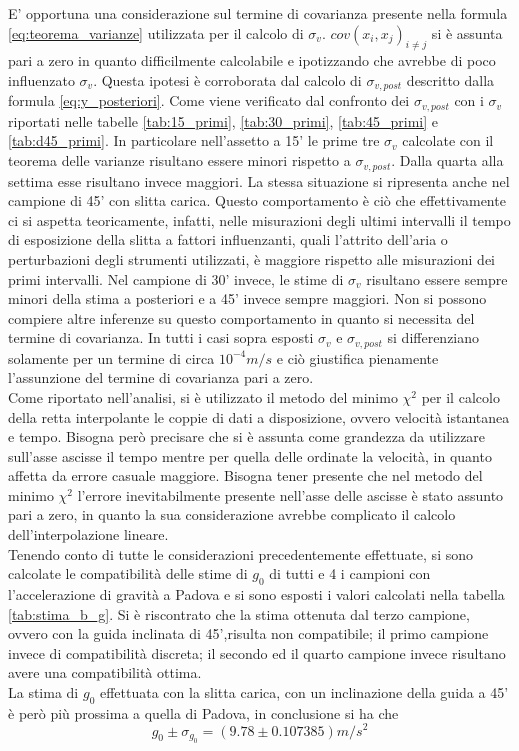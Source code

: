 \documentclass[a4paper,11pt,oneside]{article}
\begin{document}
E' opportuna una considerazione sul termine di covarianza presente nella formula \ref{eq:teorema_varianze} utilizzata per il calcolo di $\sigma_v$. $cov(x_{i},x_{j})_{i \neq j}$  si è assunta pari a zero in quanto difficilmente calcolabile e ipotizzando che avrebbe di poco influenzato $\sigma_{v}$. Questa ipotesi è corroborata dal calcolo di $\sigma_{v, post}$ descritto dalla formula \ref{eq:y_posteriori}. Come viene verificato dal confronto dei $\sigma_{v, post}$ con i $\sigma_{v}$ riportati nelle tabelle \ref{tab:15_primi}, \ref{tab:30_primi}, \ref{tab:45_primi} e \ref{tab:d45_primi}. In particolare nell'assetto a 15' le prime tre $\sigma_{v}$ calcolate con il teorema delle varianze risultano essere minori rispetto a $\sigma_{v, post}$. Dalla quarta alla settima esse risultano invece maggiori. La stessa situazione si ripresenta anche nel campione di 45' con slitta carica. Questo comportamento è ciò che effettivamente ci si aspetta teoricamente, infatti, nelle misurazioni degli ultimi intervalli il tempo di esposizione della slitta a fattori influenzanti, quali l'attrito dell'aria o perturbazioni degli strumenti utilizzati, è maggiore rispetto alle misurazioni dei primi intervalli. Nel campione di 30' invece, le stime di $\sigma_{v}$ risultano essere sempre minori della stima a posteriori e a 45' invece sempre maggiori. Non si possono compiere altre inferenze su questo comportamento in quanto si necessita del termine di covarianza. In tutti i casi sopra esposti $\sigma_{v}$ e $\sigma_{v, post}$ si differenziano solamente per un termine di circa $10^{-4}\si{m/s}$ e ciò giustifica pienamente l'assunzione del termine di covarianza pari a zero.\\
Come riportato nell'analisi, si è utilizzato il metodo del minimo  ${\chi}^2$ per il calcolo della retta interpolante le coppie di dati a disposizione, ovvero velocità istantanea e tempo. Bisogna però precisare che si è assunta come grandezza da utilizzare sull'asse ascisse il tempo mentre per quella delle ordinate la velocità, in quanto affetta da errore casuale maggiore. Bisogna tener presente che nel metodo del minimo ${\chi}^{2}$ l'errore inevitabilmente presente nell'asse delle ascisse è stato assunto pari a zero, in quanto la sua considerazione avrebbe complicato il calcolo dell'interpolazione lineare. \\
Tenendo conto di tutte le considerazioni precedentemente effettuate, si sono calcolate le compatibilità delle stime di $g_0$ di tutti e 4 i campioni con l'accelerazione di gravità a Padova e si sono esposti i valori calcolati nella tabella \ref{tab:stima_b_g}. Si è riscontrato che la stima ottenuta dal terzo campione, ovvero con la guida inclinata di 45',risulta non compatibile; il primo campione invece di compatibilità discreta; il secondo ed il quarto campione invece risultano avere una compatibilità ottima.\\
La stima di $g_0$ effettuata con la slitta carica, con un inclinazione della guida a 45' è però più prossima a quella di Padova, in conclusione si ha che
\begin{equation*}
    g_0\pm\sigma_{g_0}=\left ( 9.78 \pm 0.107385 \right ) m/s^{2}
\end{equation*}
\end{document}
